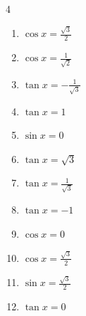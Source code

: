 \begin{multicols}{4}
\begin{enumerate}
  \item $\displaystyle \cos{x}  = \frac{\sqrt{3}}{2}$


  \item $\displaystyle \cos{x}  = \frac{1}{\sqrt{2}}$


  \item $\displaystyle \tan{x}  = -\frac{1}{\sqrt{3}}$


  \item $\displaystyle \tan{x}  = 1$


  \item $\displaystyle \sin{x}  = 0$


  \item $\displaystyle \tan{x}  = \sqrt{3}$


  \item $\displaystyle \tan{x}  = \frac{1}{\sqrt{3}}$


  \item $\displaystyle \tan{x}  = -1$


  \item $\displaystyle \cos{x}  = 0$


  \item $\displaystyle \cos{x}  = \frac{\sqrt{3}}{2}$


  \item $\displaystyle \sin{x}  = \frac{\sqrt{3}}{2}$


  \item $\displaystyle \tan{x}  = 0$


\end{enumerate}
\end{multicols}
